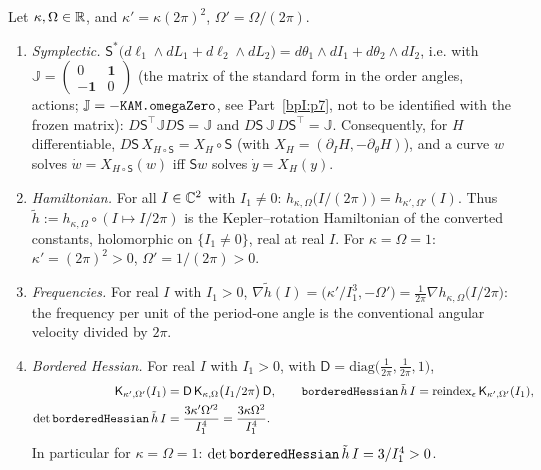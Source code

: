 \begin{lemma}[Conversion]\label{bpI:p6:conversion}
Let $\kappa,\Omega\in\mathbb{R}$, and $\kappa'=\kappa(2\pi)^2$, $\Omega'=\Omega/(2\pi)$.
\begin{enumerate}[label=(\alph*)]
\item \emph{Symplectic.} $\mathsf S^*\bigl(d\ell_1\wedge dL_1+d\ell_2\wedge dL_2\bigr)=d\theta_1\wedge dI_1+d\theta_2\wedge dI_2$, i.e. with $\mathbb J=\begin{pmatrix}0&\mathbf 1\\-\mathbf 1&0\end{pmatrix}$
  (the matrix of the standard form in the order angles, actions; $\mathbb J=-\texttt{KAM.omegaZero}$, see Part~\ref{bpI:p7}, not to be identified with the frozen matrix): $D\mathsf S^{\top}\mathbb JD\mathsf S=\mathbb J$ and $D\mathsf S\,\mathbb J\,D\mathsf S^{\top}=\mathbb J$.
  Consequently, for $H$ differentiable, $D\mathsf S\,X_{H\circ\mathsf S}=X_H\circ\mathsf S$ (with $X_H=(\partial_IH,-\partial_\theta H)$),
  and a curve $w$ solves $\dot w=X_{H\circ\mathsf S}(w)$ iff $\mathsf Sw$ solves $\dot y=X_H(y)$.
\item \emph{Hamiltonian.} For all $I\in\mathbb{C}^2$ with $I_1\neq0$: $h_{\kappa,\Omega}\bigl(I/(2\pi)\bigr)=h_{\kappa',\Omega'}(I)$. Thus $\tilde h:=h_{\kappa,\Omega}\circ(I\mapsto I/2\pi)$ is the Kepler--rotation Hamiltonian
  of the converted constants, holomorphic on $\{I_1\ne0\}$, real at real $I$. For $\kappa=\Omega=1$: $\kappa'=(2\pi)^2>0$, $\Omega'=1/(2\pi)>0$.
\item \emph{Frequencies.} For real $I$ with $I_1>0$, $\nabla\tilde h(I)=\bigl(\kappa'/I_1^3,-\Omega'\bigr)=\frac1{2\pi}\nabla h_{\kappa,\Omega}\bigl(I/2\pi\bigr)$: the frequency per unit of the period-one angle is the conventional angular velocity divided by $2\pi$.
\item \emph{Bordered Hessian.} For real $I$ with $I_1>0$, with $\mathsf D=\mathrm{diag}\bigl(\tfrac1{2\pi},\tfrac1{2\pi},1\bigr)$,
  \[
  \begin{aligned}
  \mathsf K_{\kappa',\Omega'}(I_1)&=\mathsf D\,\mathsf K_{\kappa,\Omega}\bigl(I_1/2\pi\bigr)\,\mathsf D,\qquad
  \texttt{borderedHessian}\,\tilde h\,I=\mathrm{reindex}_\epsilon\,\mathsf K_{\kappa',\Omega'}(I_1),\\
  \det\texttt{borderedHessian}\,\tilde h\,I&=\frac{3\kappa'\Omega'^2}{I_1^4}=\frac{3\kappa\Omega^2}{I_1^4}.
  \end{aligned}
  \]
  In particular for $\kappa=\Omega=1$: $\det\texttt{borderedHessian}\,\tilde h\,I=3/I_1^4>0$.
\end{enumerate}
\end{lemma}

